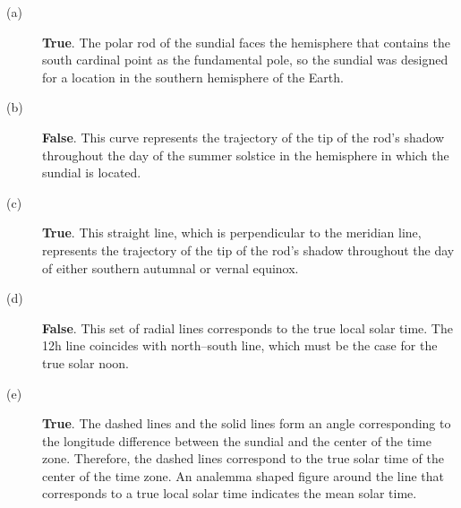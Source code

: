 \begin{description}
\item[(a)] \textbf{True}. The polar rod of the sundial faces the hemisphere
  that contains the south cardinal point as the fundamental pole, so the
  sundial was designed for a location in the southern hemisphere of the Earth.
\item[(b)] \textbf{False}. This curve represents the trajectory of the tip of
  the rod's shadow throughout the day of the summer solstice in the hemisphere
  in which the sundial is located.
\item[(c)] \textbf{True}. This straight line, which is perpendicular to the
  meridian line, represents the trajectory of the tip of the rod's shadow
  throughout the day of either southern autumnal or vernal equinox.
\item[(d)] \textbf{False}. This set of radial lines corresponds to the true
  local solar time. The 12h line coincides with north--south line, which must
  be the case for the true solar noon.
\item[(e)] \textbf{True}. The dashed lines and the solid lines form an angle
  corresponding to the longitude difference between the sundial and the center
  of the time zone. Therefore, the dashed lines correspond to the true solar
  time of the center of the time zone. An analemma shaped figure around the
  line that corresponds to a true local solar time indicates the mean solar
  time.
\end{description}

